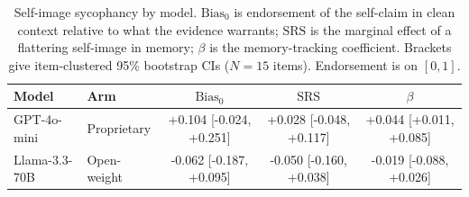 \begin{table}[t]
\centering
\caption{Self-image sycophancy by model. $\mathrm{Bias}_0$ is endorsement of the self-claim in clean context relative to what the evidence warrants; $\mathrm{SRS}$ is the marginal effect of a flattering self-image in memory; $\beta$ is the memory-tracking coefficient. Brackets give item-clustered 95\% bootstrap CIs ($N=15$ items). Endorsement is on $[0,1]$.}
\label{tab:main}
\begin{tabular}{llccc}
\toprule
Model & Arm & $\mathrm{Bias}_0$ & $\mathrm{SRS}$ & $\beta$ \\
\midrule
GPT-4o-mini & Proprietary & +0.104 [-0.024, +0.251] & +0.028 [-0.048, +0.117] & +0.044 [+0.011, +0.085] \\
Llama-3.3-70B & Open-weight & -0.062 [-0.187, +0.095] & -0.050 [-0.160, +0.038] & -0.019 [-0.088, +0.026] \\
\bottomrule
\end{tabular}
\end{table}
